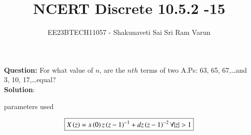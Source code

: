 \documentclass[journal,12pt,twocolumn]{IEEEtran}
\theoremstyle{remark}
\begin{document}

\vspace{3cm}

\title{NCERT Discrete 10.5.2 -15}
\author{EE23BTECH11057 - Shakunaveti Sai Sri Ram Varun$^{}$%
}
\maketitle
\newpage
\bigskip

\vspace{2cm}
\textbf{Question: }
For what value of $ n$, are the $ nth$ terms of two A.Ps: 63, 65, 67,\dots and 3, 10, 17,\dots equal?\\
\vspace{0.5cm}
\textbf{Solution}:

\begin{table}[htbp] 
\centering

\caption{parameters used}
\label{table 1}
\end{table}
\begin{align}
\boxed{X\brak{z} = x\brak{0}z\brak{z-1}^{-1} + dz\brak{z-1}^{-2}  \forall  |z|>1}\label{eq:5}
\end{align}
\end{document}
